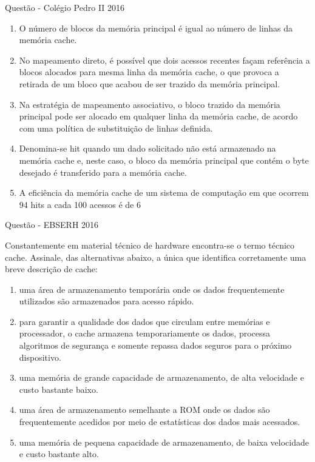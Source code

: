 \documentclass[aspectratio=169,
				xcolor=table]{beamer}
\begin{document}
	\begin{frame}{Questão - Colégio Pedro II 2016}
		\begin{enumerate}[I]
			\item O número de blocos da memória principal é igual ao número de linhas da memória cache.
			\item No mapeamento direto, é possível que dois acessos recentes façam referência a blocos alocados para mesma linha da memória cache, o que provoca a retirada de um bloco que acabou de ser trazido da memória principal.
			\item Na estratégia de mapeamento associativo, o bloco trazido da memória principal pode ser alocado em qualquer linha da memória cache, de acordo com uma política de substituição de linhas definida.
			\item Denomina-se hit quando um dado solicitado não está armazenado na memória cache e, neste caso, o bloco da memória principal que contém o byte desejado é transferido para a memória cache.
			\item A eficiência da memória cache de um sistema de computação em que ocorrem 94 hits a cada 100 acessos é de 6%
		\end{enumerate}
			
	
		\end{frame}	


		\begin{frame}{Questão - EBSERH 2016}
		
		Constantemente em material técnico de hardware encontra-se o termo técnico cache. Assinale, das alternativas abaixo, a única que identifica corretamente uma breve descrição de cache: 
		
		\begin{enumerate}[a]
			\item uma área de armazenamento temporária onde os dados frequentemente utilizados são armazenados para acesso rápido.
			\item 	para garantir a qualidade dos dados que circulam entre memórias e processador, o cache armazena temporariamente os dados, processa algoritmos de segurança e somente repassa dados seguros para o próximo dispositivo. 
			\item uma memória de grande capacidade de armazenamento, de alta velocidade e custo bastante baixo.
			\item uma área de armazenamento semelhante a ROM onde os dados são frequentemente acedidos por meio de estatísticas dos dados mais acessados.
			\item uma memória de pequena capacidade de armazenamento, de baixa velocidade e custo bastante alto.		
		\end{enumerate}

	
		\end{frame}
\end{document}

